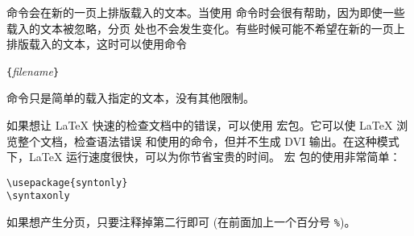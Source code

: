  命令会在新的一页上排版载入的文本。当使用  命令时会很有帮助，因为即使一些载入的文本被忽略，分页
处也不会发生变化。有些时候可能不希望在新的一页上排版载入的文本，这时可以使用命令
\begin{lscommand}
\verb|{|\emph{filename}\verb|}|
\end{lscommand}
\noindent%
 命令只是简单的载入指定的文本，没有其他限制。


如果想让 \LaTeX{} 快速的检查文档中的错误，可以使用  宏包。它可以使 \LaTeX{} 浏览整个文档，检查语法错误
和使用的命令，但并不生成 DVI 输出。在这种模式下，\LaTeX{} 运行速度很快，可以为你节省宝贵的时间。 宏
包的使用非常简单：
\begin{verbatim}
\usepackage{syntonly}
\syntaxonly
\end{verbatim}
如果想产生分页，只要注释掉第二行即可 (在前面加上一个百分号 \verb|%|)。


%

